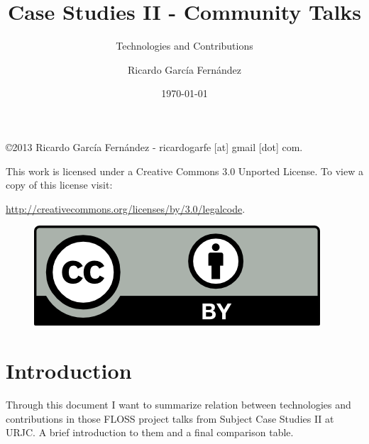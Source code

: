 \documentclass[11pt]{scrartcl}
\title{\textbf{Case Studies II - Community Talks}}
\subtitle{Technologies and Contributions}
\author{Ricardo Garc\'ia Fern\'andez}
\date{\today}
\begin{document}
\maketitle

\vfill

\begin{flushright}
    \copyright  2013 Ricardo Garc\'ia Fern\'andez - ricardogarfe [at] gmail [dot] com.

    This work is licensed under a Creative Commons 3.0 Unported License.
    To view a copy of this license visit:
 
    \url{http://creativecommons.org/licenses/by/3.0/legalcode}.
\end{flushright}

\begin{figure}[h]
    \begin{flushright}	
        \includegraphics{by}
        \label{fig:by}
    \end{flushright}
\end{figure}

\newpage

\tableofcontents

\newpage


\section{Introduction}
\label{sec:introduction}

\par Through this document I want to summarize relation between technologies and contributions in those FLOSS project talks from Subject Case Studies II at URJC. A brief introduction to them and a final comparison table.
















\end{document}
